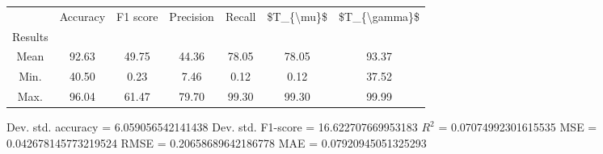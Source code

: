 \begin{tabular}{|c|c|c|c|c|c|c|}
\toprule
{} &  Accuracy &  F1 score &  Precision &  Recall &  \$T\_\{\textbackslash mu\}\$ &  \$T\_\{\textbackslash gamma\}\$ \\
Results &           &           &            &         &            &               \\
\hline
Mean    &     92.63 &     49.75 &      44.36 &   78.05 &      78.05 &         93.37 \\
Min.    &     40.50 &      0.23 &       7.46 &    0.12 &       0.12 &         37.52 \\
Max.    &     96.04 &     61.47 &      79.70 &   99.30 &      99.30 &         99.99 \\
\bottomrule
\end{tabular}

 Dev. std. accuracy = 6.059056542141438
 Dev. std. F1-score = 16.622707669953183
 $R^2$ = 0.07074992301615535
 MSE = 0.042678145773219524
 RMSE = 0.20658689642186778
 MAE = 0.07920945051325293